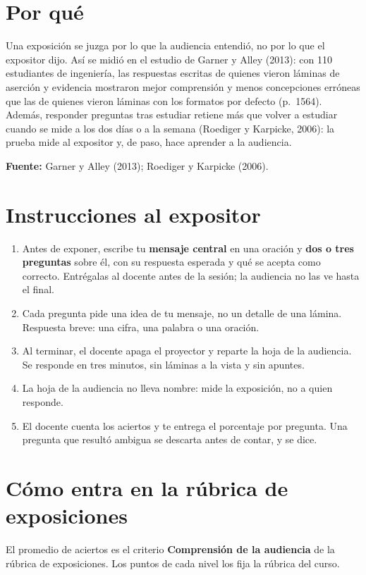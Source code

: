 \documentclass{academic-report}
\begin{document}
\encabezado

\section*{Por qué}
Una exposición se juzga por lo que la audiencia entendió, no por lo que el expositor dijo. Así
se midió en el estudio de Garner y Alley (2013): con 110 estudiantes de ingeniería, las
respuestas escritas de quienes vieron láminas de aserción y evidencia mostraron mejor
comprensión y menos concepciones erróneas que las de quienes vieron láminas con los formatos
por defecto (p.~1564). Además, responder preguntas tras estudiar retiene más que volver a
estudiar cuando se mide a los dos días o a la semana (Roediger y Karpicke, 2006): la prueba
mide al expositor y, de paso, hace aprender a la audiencia.

\noindent\textbf{Fuente:} Garner y Alley (2013); Roediger y Karpicke (2006).

\section*{Instrucciones al expositor}
\begin{enumerate}
  \item Antes de exponer, escribe tu \textbf{mensaje central} en una oración y \textbf{dos o tres
        preguntas} sobre él, con su respuesta esperada y qué se acepta como correcto. Entrégalas
        al docente antes de la sesión; la audiencia no las ve hasta el final.
  \item Cada pregunta pide una idea de tu mensaje, no un detalle de una lámina. Respuesta breve:
        una cifra, una palabra o una oración.
  \item Al terminar, el docente apaga el proyector y reparte la hoja de la audiencia. Se responde
        en tres minutos, sin láminas a la vista y sin apuntes.
  \item La hoja de la audiencia no lleva nombre: mide la exposición, no a quien responde.
  \item El docente cuenta los aciertos y te entrega el porcentaje por pregunta. Una pregunta que
        resultó ambigua se descarta antes de contar, y se dice.
\end{enumerate}

\section*{Cómo entra en la rúbrica de exposiciones}
El promedio de aciertos es el criterio \textbf{Comprensión de la audiencia} de la rúbrica de
exposiciones. Los puntos de cada nivel los fija la rúbrica del curso.
\end{document}
